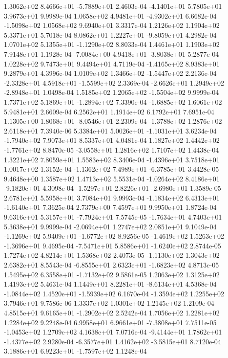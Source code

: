  1.3062e+02  8.4666e+01 -5.7889e+01  2.4603e-04
-4.1401e+01  5.7805e+01  3.9673e+01  9.9989e-04
 1.0658e+02  4.9481e+01 -4.9302e+01  6.6682e-04
-1.5098e+02  1.0568e+02  9.6940e+01  3.3317e-04
1.2126e+02 1.1904e+02 5.3371e+01  5.7018e-04
 8.0862e+01  1.2227e+01 -9.8059e+01  4.2982e-04
 1.0701e+02  5.1355e+01 -1.1290e+02  8.8033e-04
1.4461e+01 1.1903e+02 7.9148e+01  1.1928e-04
-7.0084e+00  4.9418e+01 -3.8038e+01  5.2877e-04
1.0228e+02 9.7473e+01 9.4494e+01  4.7119e-04
-1.4165e+02  8.9383e+01  9.2879e+01  4.3996e-04
 1.0109e+02  1.3466e+02 -1.5447e+02  2.2136e-04
-2.3328e+01  4.5918e+01 -1.5599e+02  2.3369e-04
-2.6626e+01  1.2949e+02 -2.8948e+01  1.0498e-04
 1.5185e+02  1.2065e+02 -1.5504e+02  9.9999e-04
 1.7371e+02  5.1869e+01 -1.2894e+02  7.3390e-04
-1.6885e+02  1.6061e+02  5.9481e+01  2.6609e-04
6.2562e+01 1.1914e+02 6.1792e+01  7.6951e-04
 1.1305e+00  1.8068e+01 -8.0546e+01  2.2309e-04
-1.3788e+02  1.2876e+02  2.6118e+01  7.3940e-06
 5.3384e+01  5.0026e+01 -1.1031e+01  3.6234e-04
-1.7940e+02  7.9073e+01  8.5337e+01  4.0481e-04
 1.1827e+02  1.4442e+02 -1.7761e+02  8.8470e-05
-3.0558e+01  1.2816e+02  1.7107e+02  1.4438e-04
1.3221e+02 7.8059e+01 1.5583e+02  8.3406e-04
-1.4396e+01  3.7518e+01  1.0017e+02  1.3152e-04
-1.1362e+02  7.4989e+01 -6.3785e+01  3.4428e-05
9.4648e+00 1.3587e+02 1.4713e+02  5.5531e-04
-1.0264e+02  8.4186e+01 -9.1820e+01  4.3098e-04
-1.5297e+01  2.8226e+01 -2.6980e+01  1.3589e-05
2.6781e+01 5.5958e+01 3.7084e+01  9.9993e-04
-1.1834e+02  6.4313e+01 -1.6140e+01  7.3625e-04
2.7379e+00 7.4597e+01 9.9950e+01  1.8724e-04
 9.6316e+01  5.3157e+01 -7.7924e+01  7.5745e-05
-1.7634e+01  4.7403e+01  5.3638e+01  9.9999e-04
-2.0694e+01  1.2747e+02  2.0851e+01  9.1049e-04
-1.1269e+02  5.9409e+01 -1.6772e+02  8.9256e-05
-1.4619e+02  1.5263e+02 -1.3696e+01  9.4695e-04
-7.5471e+01  5.8586e+01 -1.6240e+02  2.8744e-05
1.7274e+02 4.8214e+01 1.5368e+02  2.4073e-05
-1.1130e+02  1.3043e+02  2.6382e+01  8.5543e-04
-6.8555e+01  2.6323e+01 -1.6823e+02  4.8713e-05
 1.5495e+02  6.3558e+01 -1.7132e+02  9.5861e-05
1.2063e+02 1.3125e+02 1.4193e+02  5.4631e-04
 1.1449e+01  8.2281e+01 -8.6134e+01  4.5368e-04
-1.0844e+02  1.4520e+01 -1.5939e+02  6.1670e-04
-1.3594e+02  1.2255e+02  3.7946e+01  9.7586e-06
1.3337e+02 1.0301e+02 1.2145e+02  1.2109e-04
 4.8515e+01  9.6165e+01 -1.2902e+02  2.5242e-04
1.7056e+02 1.2281e+02 1.2284e+02  9.2248e-04
 6.9958e+01  6.9661e+01 -7.3808e+01  7.7511e-05
-1.0453e+02  1.2709e+02  4.1638e+01  7.0716e-04
-9.4144e+01  1.7862e+01 -1.4377e+02  2.9280e-04
-6.3577e+01  1.4162e+02 -3.5815e+01  8.7120e-04
 3.1886e+01  6.9223e+01 -1.7597e+02  1.1248e-04
